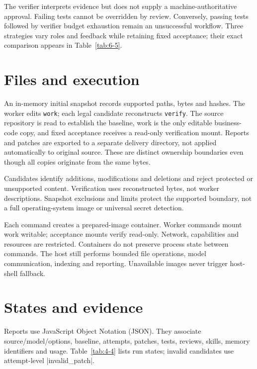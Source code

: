 The verifier interprets evidence but does not supply a machine-authoritative approval. Failing tests cannot be overridden by review. Conversely, passing tests followed by verifier budget exhaustion remain an unsuccessful workflow. Three strategies vary roles and feedback while retaining fixed acceptance; their exact comparison appears in Table~\ref{tab:6-5}.

\section{Files and execution}\label{sec:4.3}

An in-memory initial snapshot records supported paths, bytes and hashes. The worker edits \texttt{work}; each legal candidate reconstructs \texttt{verify}. The source repository is read to establish the baseline, work is the only editable business-code copy, and fixed acceptance receives a read-only verification mount. Reports and patches are exported to a separate delivery directory, not applied automatically to original source. These are distinct ownership boundaries even though all copies originate from the same bytes.

Candidates identify additions, modifications and deletions and reject protected or unsupported content. Verification uses reconstructed bytes, not worker descriptions. Snapshot exclusions and limits protect the supported boundary, not a full operating-system image or universal secret detection.

Each command creates a prepared-image container. Worker commands mount work writable; acceptance mounts verify read-only. Network, capabilities and resources are restricted. Containers do not preserve process state between commands. The host still performs bounded file operations, model communication, indexing and reporting. Unavailable images never trigger host-shell fallback.

\section{States and evidence}\label{sec:4.4}

Reports use JavaScript Object Notation (JSON). They associate source/model/options, baseline, attempts, patches, tests, reviews, skills, memory identifiers and usage. Table~\ref{tab:4-4} lists run states; invalid candidates use attempt-level \code|invalid_patch|.

